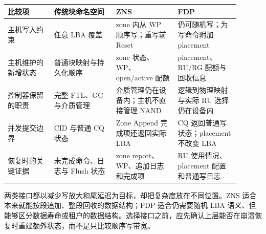 
\begin{longtable}{L{0.18\linewidth}L{0.24\linewidth}L{0.24\linewidth}L{0.24\linewidth}}
\toprule
比较项 & 传统块命名空间 & ZNS & FDP \\
\midrule
主机写入约束 & 任意 LBA 覆盖 & zone 内从 WP 顺序写；重写前 Reset & 仍可随机写；为写命令附加 placement \\\tablerowrule
主机维护的新增状态 & 普通块映射与持久化顺序 & zone 状态、WP、open/active 配额 & placement、RU/RG 配额与回收信息 \\\tablerowrule
控制器保留的职责 & 完整 FTL、GC 与介质管理 & 介质管理仍在设备内；主机不直接管理 NAND & 逻辑到物理映射与实际 RU 选择仍在设备内 \\\tablerowrule
并发提交边界 & CID 与普通 CQ 状态 & Zone Append 完成项还返回实际 LBA & CQ 返回普通写状态；placement 不改变 LBA \\\tablerowrule
恢复时的关键证据 & 未完成命令、日志与 Flush 状态 & zone report、WP、追加日志和完成项 & RU 使用情况、placement 配置和普通写日志 \\
\bottomrule
\end{longtable}

两类接口都以减少写放大和尾延迟为目标，却把复杂度放在不同位置。ZNS 适合本来就能按段追加、整段回收的数据结构；FDP 适合仍需要随机 LBA 语义、但能够区分数据寿命或租户的数据结构。选择接口之前，应先确认上层能否在崩溃恢复时重建额外状态，而不是只比较顺序写带宽。
